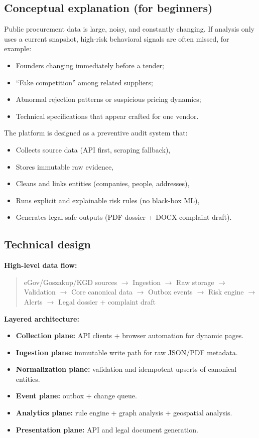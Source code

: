 \documentclass[11pt,a4paper]{article}
\begin{document}
\subsection{Conceptual explanation (for beginners)}
\begin{conceptbox}
Public procurement data is large, noisy, and constantly changing. If analysis only uses a current snapshot, high-risk behavioral signals are often missed, for example:
\begin{itemize}[leftmargin=1.4em]
  \item Founders changing immediately before a tender;
  \item ``Fake competition'' among related suppliers;
  \item Abnormal rejection patterns or suspicious pricing dynamics;
  \item Technical specifications that appear crafted for one vendor.
\end{itemize}

The platform is designed as a preventive audit system that:
\begin{itemize}[leftmargin=1.4em]
  \item Collects source data (API first, scraping fallback),
  \item Stores immutable raw evidence,
  \item Cleans and links entities (companies, people, addresses),
  \item Runs explicit and explainable risk rules (no black-box ML),
  \item Generates legal-safe outputs (PDF dossier + DOCX complaint draft).
\end{itemize}
\end{conceptbox}

\subsection{Technical design}
\textbf{High-level data flow:}
\begin{quote}
eGov/Goszakup/KGD sources $\rightarrow$ Ingestion $\rightarrow$ Raw storage $\rightarrow$ Validation $\rightarrow$ Core canonical data $\rightarrow$ Outbox events $\rightarrow$ Risk engine $\rightarrow$ Alerts $\rightarrow$ Legal dossier + complaint draft
\end{quote}

\textbf{Layered architecture:}
\begin{itemize}[leftmargin=1.4em]
  \item \textbf{Collection plane:} API clients + browser automation for dynamic pages.
  \item \textbf{Ingestion plane:} immutable write path for raw JSON/PDF metadata.
  \item \textbf{Normalization plane:} validation and idempotent upserts of canonical entities.
  \item \textbf{Event plane:} outbox + change queue.
  \item \textbf{Analytics plane:} rule engine + graph analysis + geospatial analysis.
  \item \textbf{Presentation plane:} API and legal document generation.
\end{itemize}
\end{document}
